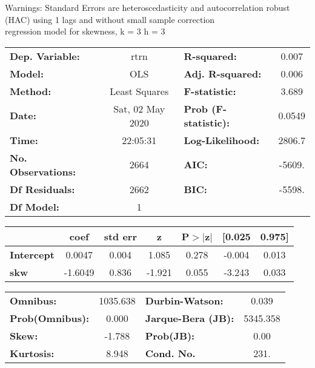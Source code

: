 Warnings: \newline
 [1] Standard Errors are heteroscedasticity and autocorrelation robust (HAC) using 1 lags and without small sample correction\\ 

regression model for skewness, k = 3 h = 3\begin{center}
\begin{tabular}{lclc}
\toprule
\textbf{Dep. Variable:}    &       rtrn       & \textbf{  R-squared:         } &     0.007   \\
\textbf{Model:}            &       OLS        & \textbf{  Adj. R-squared:    } &     0.006   \\
\textbf{Method:}           &  Least Squares   & \textbf{  F-statistic:       } &     3.689   \\
\textbf{Date:}             & Sat, 02 May 2020 & \textbf{  Prob (F-statistic):} &   0.0549    \\
\textbf{Time:}             &     22:05:31     & \textbf{  Log-Likelihood:    } &    2806.7   \\
\textbf{No. Observations:} &        2664      & \textbf{  AIC:               } &    -5609.   \\
\textbf{Df Residuals:}     &        2662      & \textbf{  BIC:               } &    -5598.   \\
\textbf{Df Model:}         &           1      & \textbf{                     } &             \\
\bottomrule
\end{tabular}
\begin{tabular}{lcccccc}
                   & \textbf{coef} & \textbf{std err} & \textbf{z} & \textbf{P$> |$z$|$} & \textbf{[0.025} & \textbf{0.975]}  \\
\midrule
\textbf{Intercept} &       0.0047  &        0.004     &     1.085  &         0.278        &       -0.004    &        0.013     \\
\textbf{skw}       &      -1.6049  &        0.836     &    -1.921  &         0.055        &       -3.243    &        0.033     \\
\bottomrule
\end{tabular}
\begin{tabular}{lclc}
\textbf{Omnibus:}       & 1035.638 & \textbf{  Durbin-Watson:     } &    0.039  \\
\textbf{Prob(Omnibus):} &   0.000  & \textbf{  Jarque-Bera (JB):  } & 5345.358  \\
\textbf{Skew:}          &  -1.788  & \textbf{  Prob(JB):          } &     0.00  \\
\textbf{Kurtosis:}      &   8.948  & \textbf{  Cond. No.          } &     231.  \\
\bottomrule
\end{tabular}
\end{center}

